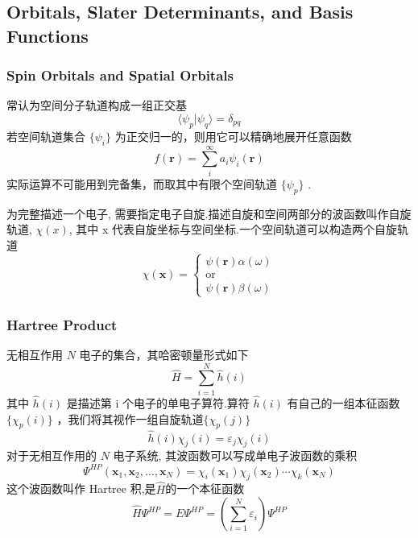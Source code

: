 \documentclass[fontset=none,12pt,a4paper]{ctexart}
\numberwithin{equation}{section}
\begin{document}
\subsection{Orbitals, Slater Determinants, and Basis Functions}
\subsubsection{Spin Orbitals and Spatial Orbitals}
常认为空间分子轨道构成一组正交基
\begin{equation}
  \langle \psi_p | \psi_q \rangle = \delta_{pq}
\end{equation}
若空间轨道集合 $\{\psi_i\}$ 为正交归一的，则用它可以精确地展开任意函数
\begin{equation}
  f(\mathbf{r}) = \sum_i^{\infty} a_i \psi_i(\mathbf{r})
\end{equation}
实际运算不可能用到完备集，而取其中有限个空间轨道 $\{\psi_p\}$ .

为完整描述一个电子, 需要指定电子自旋.描述自旋和空间两部分的波函数叫作自旋轨道, 
$\chi(x)$, 其中 x 代表自旋坐标与空间坐标.一个空间轨道可以构造两个自旋轨道
\begin{equation}
  \chi(\mathbf{x})=\begin{cases}
    \psi(\mathbf{r})\alpha(\omega) \\
    \text{or}\\
    \psi(\mathbf{r})\beta(\omega)
  \end{cases}
\end{equation}
\subsubsection{Hartree Product}\label{sec:HartreeProduct}
无相互作用 $N$ 电子的集合，其哈密顿量形式如下
\begin{equation}
  \hat{H} = \sum_{i=1}^N \hat{h}(i)
\end{equation}
其中 $\hat{h}(i)$ 是描述第 i 个电子的单电子算符.算符 $\hat{h}(i)$ 
有自己的一组本征函数 $\{\chi_p(i)\}$ ，我们将其视作一组自旋轨道${\{\chi_p(j)\}}$
\begin{equation}
  \hat{h}(i) \chi_j(i) = \varepsilon_j \chi_j(i)
\end{equation}
对于无相互作用的 $N$ 电子系统, 其波函数可以写成单电子波函数的乘积
\begin{equation}
  \Psi^{HP}(\mathbf{x}_1, \mathbf{x}_2, \ldots, \mathbf{x}_N) = \chi_i(\mathbf{x}_1) \chi_j(\mathbf{x}_2) \cdots \chi_k(\mathbf{x}_N)
\end{equation}
这个波函数叫作 Hartree 积,是$\hat{H}$的一个本征函数
\begin{equation}
  \hat{H} \Psi^{HP} =E\Psi^{HP}=
   \left( \sum_{i=1}^N \varepsilon_i \right) \Psi^{HP}
\end{equation}
\end{document}
